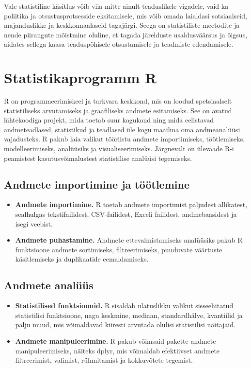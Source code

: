 \documentclass[
]{book}
\providecommand{\tightlist}{%
  \setlength{\itemsep}{0pt}\setlength{\parskip}{0pt}}
\begin{document}
Vale statistiline käsitlus võib viia mitte ainult teaduslikele vigadele, vaid ka poliitika ja otsustusprotsesside eksitamisele, mis võib omada laialdasi sotsiaalseid, majanduslikke ja keskkonnaalaseid tagajärgi. Seega on statistiliste meetodite ja nende piirangute mõistmine oluline, et tagada järelduste usaldusväärsus ja õigsus, aidates sellega kaasa teaduspõhisele otsustamisele ja teadmiste edendamisele.

\section{Statistikaprogramm R}\label{statistikaprogramm-r}

R on programmeerimiskeel ja tarkvara keskkond, mis on loodud spetsiaalselt statistiliseks arvutamiseks ja graafiliseks andmete esitamiseks. See on avatud lähtekoodiga projekt, mida toetab suur kogukond ning mida eelistavad andmeteadlased, statistikud ja teadlased üle kogu maailma oma andmeanalüüsi vajadusteks. R pakub laia valikut tööriistu andmete importimiseks, töötlemiseks, modelleerimiseks, analüüsiks ja visualiseerimiseks. Järgnevalt on ülevaade R-i peamistest kasutusvõimalustest statistilise analüüsi tegemiseks.

\subsection{Andmete importimine ja töötlemine}\label{andmete-importimine-ja-tuxf6uxf6tlemine}

\begin{itemize}
\tightlist
\item
  \textbf{Andmete importimine.} R toetab andmete importimist paljudest allikatest, sealhulgas tekstifailidest, CSV-failidest, Exceli failidest, andmebaasidest ja isegi veebist.
\item
  \textbf{Andmete puhastamine.} Andmete ettevalmistamiseks analüüsiks pakub R funktsioone andmete sortimiseks, filtreerimiseks, puuduvate väärtuste käsitlemiseks ja duplikaatide eemaldamiseks.
\end{itemize}

\subsection{Andmete analüüs}\label{andmete-analuxfcuxfcs}

\begin{itemize}
\tightlist
\item
  \textbf{Statistilised funktsioonid.} R sisaldab ulatuslikku valikut sisseehitatud statistilisi funktsioone, nagu keskmine, mediaan, standardhälve, kvantiilid ja palju muud, mis võimaldavad kiiresti arvutada olulisi statistilisi näitajaid.
\item
  \textbf{Andmete manipuleerimine.} R pakub võimsaid pakette andmete manipuleerimiseks, näiteks dplyr, mis võimaldab efektiivset andmete filtreerimist, valimist, rühmitamist ja kokkuvõtete tegemist.
\end{itemize}
\end{document}
